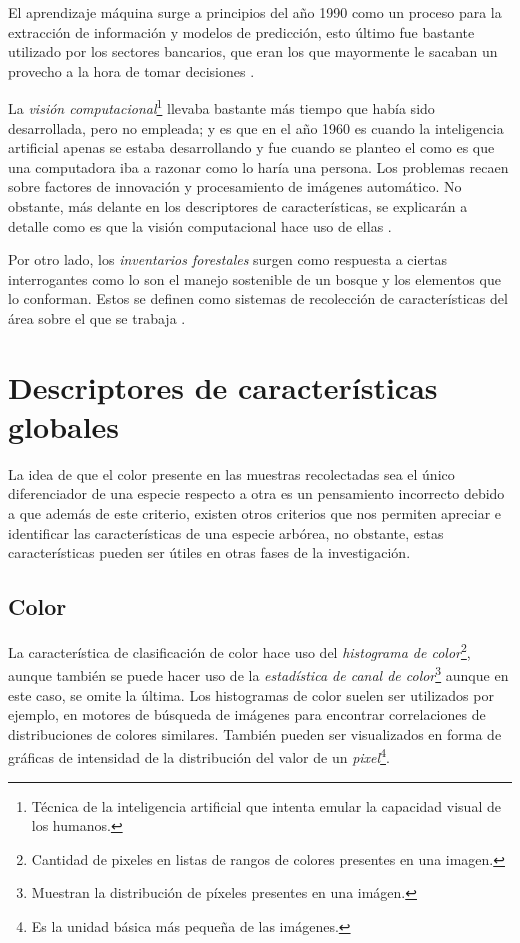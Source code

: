El aprendizaje máquina surge a principios del año 1990 como un proceso para la extracción de información y modelos de predicción, esto último fue bastante utilizado por los sectores bancarios, que eran los que mayormente le sacaban un provecho a la hora de tomar decisiones \citep{rf5}. 

La \emph{visión computacional}\footnote{Técnica de la inteligencia artificial que intenta emular la capacidad visual de los humanos.} llevaba bastante más tiempo que había sido desarrollada, pero no empleada; y es que en el año 1960 es cuando la inteligencia artificial apenas se estaba desarrollando y fue cuando se planteo el como es que una computadora iba a razonar como lo haría una persona. Los problemas recaen sobre factores de innovación y procesamiento de imágenes automático. No obstante, más delante en los descriptores de características, se explicarán a detalle como es que la visión computacional hace uso de ellas \citep{rf6}.

Por otro lado, los \emph{inventarios forestales} surgen como respuesta a ciertas interrogantes como lo son el manejo sostenible de un bosque y los elementos que lo conforman. Estos se definen como sistemas de recolección de características del área sobre el que se trabaja \citep{rf7}.

\section{Descriptores de características globales}
La idea de que el color presente en las muestras recolectadas sea el único diferenciador de una especie respecto a otra es un pensamiento incorrecto debido a que además de este criterio, existen otros criterios que nos permiten apreciar e identificar las características de una especie arbórea, no obstante, estas características pueden ser útiles en otras fases de la investigación. 

\subsection{Color}
La característica de clasificación de color hace uso del \emph{histograma de color}\footnote{Cantidad de pixeles en listas de rangos de colores presentes en una imagen.}, aunque también se puede hacer uso de la \emph{estadística de canal de color}\footnote{Muestran la distribución de píxeles presentes en una imágen.} aunque en este caso, se omite la última. Los histogramas de color suelen ser utilizados por ejemplo, en motores de búsqueda de imágenes para encontrar correlaciones de distribuciones de colores similares. También pueden ser visualizados en forma de gráficas de intensidad de la distribución del valor de un \emph{pixel}\footnote{Es la unidad básica más pequeña de las imágenes.}.

